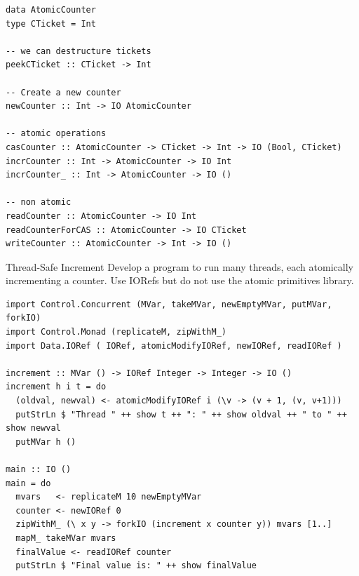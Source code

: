 \begin{verbatim}
data AtomicCounter
type CTicket = Int

-- we can destructure tickets
peekCTicket :: CTicket -> Int

-- Create a new counter
newCounter :: Int -> IO AtomicCounter

-- atomic operations
casCounter :: AtomicCounter -> CTicket -> Int -> IO (Bool, CTicket)
incrCounter :: Int -> AtomicCounter -> IO Int
incrCounter_ :: Int -> AtomicCounter -> IO ()

-- non atomic
readCounter :: AtomicCounter -> IO Int
readCounterForCAS :: AtomicCounter -> IO CTicket
writeCounter :: AtomicCounter -> Int -> IO ()
\end{verbatim}

\begin{examplebox}{Thread-Safe Increment}
	Develop a program to run many threads, each atomically incrementing a counter. Use IORefs but do not use the atomic primitives library.
	\tcblower
	\begin{verbatim}
import Control.Concurrent (MVar, takeMVar, newEmptyMVar, putMVar, forkIO)
import Control.Monad (replicateM, zipWithM_)
import Data.IORef ( IORef, atomicModifyIORef, newIORef, readIORef )

increment :: MVar () -> IORef Integer -> Integer -> IO ()
increment h i t = do
  (oldval, newval) <- atomicModifyIORef i (\v -> (v + 1, (v, v+1)))
  putStrLn $ "Thread " ++ show t ++ ": " ++ show oldval ++ " to " ++ show newval
  putMVar h ()

main :: IO ()
main = do
  mvars   <- replicateM 10 newEmptyMVar
  counter <- newIORef 0
  zipWithM_ (\ x y -> forkIO (increment x counter y)) mvars [1..]
  mapM_ takeMVar mvars
  finalValue <- readIORef counter
  putStrLn $ "Final value is: " ++ show finalValue    
    \end{verbatim}
\end{examplebox}
